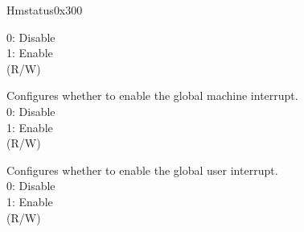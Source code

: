 \begin{register}{H}{mstatus}{0x300}
\begin{regdesc}
\begin{reglist}
0: Disable\\
1: Enable\\
(R/W)
\label{fielddesc:MSTATUSMIE}\item [MIE] Configures whether to enable the global machine interrupt.\\
0: Disable\\
1: Enable\\
(R/W)
\label{fielddesc:MSTATUSUIE}\item [UIE] Configures whether to enable the global user interrupt.\\
0: Disable\\
1: Enable\\
(R/W)
\end{reglist}\end{regdesc}
\end{register}

